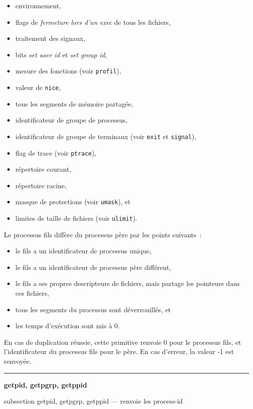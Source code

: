\documentclass [twoside] {report}
\newcommand {\primitive} [1]
    {
	\phantomsection
	{\large \textbf {#1}}
	\addcontentsline {toc} {subsection} {#1}
    }
\newcommand {\separation}
    {
	\vspace {5mm}
	\nopagebreak
	\hrule
    }
\begin{document}
\begin {itemize}
    \item environnement,
    \item flags de \textit {fermeture lors d'un exec} de tous les fichiers,
    \item traitement des signaux,
    \item bits \textit {set user id} et \textit {set group id},
    \item mesure des fonctions (voir \texttt {profil}),
    \item valeur de \texttt {nice},
    \item tous les segments de mémoire partagée,
    \item identificateur de groupe de processus,
    \item identificateur de groupe de terminaux (voir \texttt {exit} et
	\texttt {signal}),
    \item flag de trace (voir \texttt {ptrace}),
    \item répertoire courant,
    \item répertoire racine,
    \item masque de protections (voir \texttt {umask}), et
    \item limites de taille de fichiers (voir \texttt {ulimit}).
\end {itemize}

Le processus fils diffère du processus père par
les points suivants~:

\begin {itemize}
    \item le fils a un identificateur de processus unique,
    \item le fils a un identificateur de processus père différent,
    \item le fils a ses propres descripteurs de
	fichiers, mais partage les pointeurs dans ces fichiers,
    \item tous les segments du processus sont
	déverrouillés, et
    \item les temps d'exécution sont mis à 0.
\end {itemize}

En cas de duplication réussie, cette primitive
renvoie 0 pour le processus fils, et
l'identificateur du processus fils pour le père.
En cas d'erreur, la valeur -1 est renvoyée.





\separation
\primitive {getpid, getpgrp, getppid} --- renvoie les process-id
\end{document}
